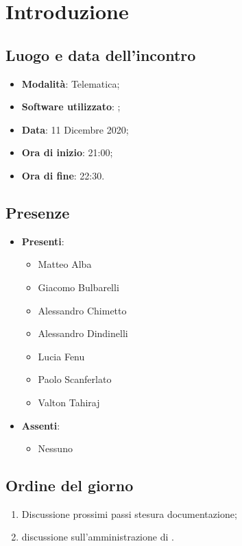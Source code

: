 \documentclass[]{article}
\begin{document}
	

	\newpage


	\section{Introduzione}
		\subsection{Luogo e data dell'incontro}
		\begin{itemize}
			\item \textbf{Modalità}: Telematica;
			\item \textbf{Software utilizzato}: ;
			\item \textbf{Data}: 11 Dicembre 2020;
			\item \textbf{Ora di inizio}: 21:00;
			\item \textbf{Ora di fine}: 22:30.
		\end{itemize}

		\subsection{Presenze}
		\begin{itemize}
			\item \textbf{Presenti}:
			\begin{itemize}
				\item Matteo Alba
				\item Giacomo Bulbarelli
				\item Alessandro Chimetto
				\item Alessandro Dindinelli
				\item Lucia Fenu
				\item Paolo Scanferlato
				\item Valton Tahiraj
			\end{itemize}
			\item \textbf{Assenti}:
			\begin{itemize}
				\item Nessuno
			\end{itemize}
		\end{itemize}


		\subsection{Ordine del giorno}
		\begin{enumerate}
			\item Discussione prossimi passi stesura documentazione;
			\item discussione sull'amministrazione di .
		\end{enumerate}
\end{document}
